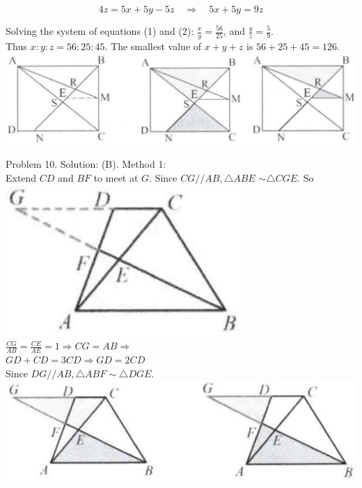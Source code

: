 \documentclass[10pt]{article}
\begin{document}
\[
4 z=5 x+5 y-5 z \quad \Rightarrow \quad 5 x+5 y=9 z
\]

Solving the system of equations (1) and (2): \(\frac{x}{y}=\frac{56}{25}\), and \(\frac{y}{z}=\frac{5}{9}\).\\
Thus \(x: y: z=56: 25: 45\). The smallest value of \(x+y+z\) is \(56+25+45=126\).\\
\includegraphics[max width=\textwidth, center]{2025_04_17_97bc1f7e44d93c271a88g-135(2)}

Problem 10. Solution: (B).
Method 1:\\
Extend \(C D\) and \(B F\) to meet at \(G\). Since \(C G / / A B, \triangle A B E\) \(\sim \triangle C G E\). So\\
\includegraphics[max width=\textwidth, center]{2025_04_17_97bc1f7e44d93c271a88g-135}\\
\(\frac{C G}{A B}=\frac{C E}{A E}=1 \Rightarrow C G=A B \Rightarrow\)\\
\(G D+C D=3 C D \Rightarrow G D=2 C D\)\\
Since \(D G / / A B, \triangle A B F \sim \triangle D G E\).\\
\includegraphics[max width=\textwidth, center]{2025_04_17_97bc1f7e44d93c271a88g-135(1)}
\end{document}
